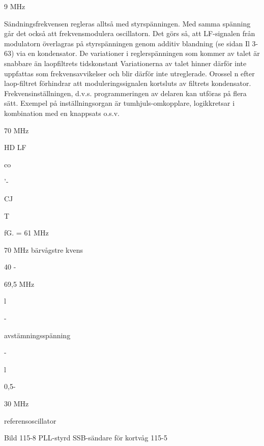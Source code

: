 \documentclass[a4paper,twoside,twocolumn,openright]{book}
\begin{document}
{{{9 MHz

Sändningsfrekvensen regleras alltså med
styrspänningen. Med samma spänning går
det också att frekvensmodulera oscillatorn.
Det görs så, att LF-signalen från modulatorn
överlagras på styrspänningen genom additiv blandning (se sidan Il 3-63) via en kondensator. De variationer i reglerspänningen
som kommer av talet är snabbare än laopfiltrets tidskonstant Variationerna av talet
hinner därför inte uppfattas som frekvensavvikelser och blir därför inte utreglerade.
Orossel n efter laop-filtret förhindrar att moduleringssignalen kortsluts av filtrets kondensator.
Frekvensinställningen, d.v.s. programmeringen av delaren kan utföras på flera
sätt. Exempel på inställningsorgan är
tumhjuls-omkopplare, logikkretsar i kombination med en knappsats o.s.v.

70 MHz

HD
LF


co

'-

CJ

T

fG. = 61 MHz

70 MHz
bärvågstre kvens

40 -

69,5 MHz

l

-

avstämningsspänning

-

l

0,5-

30 MHz

referensoscillator

Bild 115-8 PLL-styrd SSB-sändare för kortvåg
115-5

}}}
\end{document}
